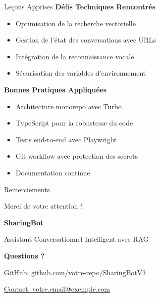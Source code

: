 \documentclass[aspectratio=169]{beamer}
\begin{document}
\begin{frame}{Leçons Apprises}
    \textbf{Défis Techniques Rencontrés}
    \begin{itemize}
        \item Optimisation de la recherche vectorielle
        \item Gestion de l'état des conversations avec URLs
        \item Intégration de la reconnaissance vocale
        \item Sécurisation des variables d'environnement
    \end{itemize}
    
    \vspace{0.5cm}
    
    \textbf{Bonnes Pratiques Appliquées}
    \begin{itemize}
        \item Architecture monorepo avec Turbo
        \item TypeScript pour la robustesse du code
        \item Tests end-to-end avec Playwright
        \item Git workflow avec protection des secrets
        \item Documentation continue
    \end{itemize}
\end{frame}

\begin{frame}{Remerciements}
    \begin{center}
        \Huge \textcolor{primaryblue}{Merci de votre attention !}
        
        \vspace{1cm}
        
        \Large \textbf{SharingBot}
        
        \normalsize Assistant Conversationnel Intelligent avec RAG
        
        \vspace{1cm}
        
        \textbf{Questions ?}
        
        \vspace{0.5cm}
        
        \small
        \href{https://github.com/votre-repo/SharingBotV3}{GitHub: github.com/votre-repo/SharingBotV3}
        
        \href{mailto:votre.email@exemple.com}{Contact: votre.email@exemple.com}
    \end{center}
\end{frame}
\end{document}
